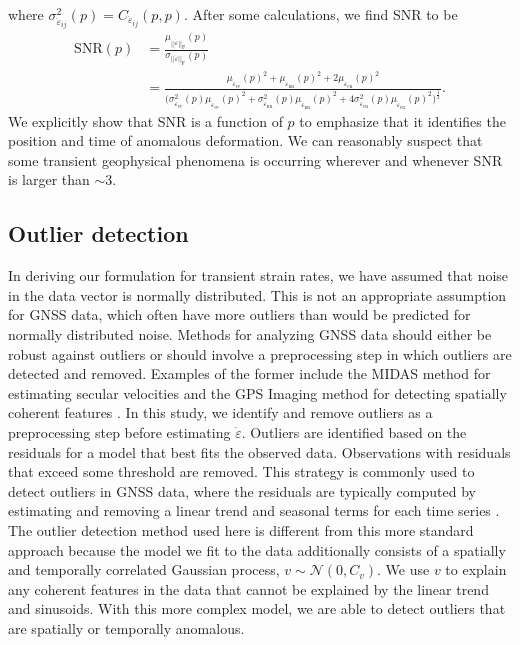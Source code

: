 \documentclass[extra,mreferee]{gji}
\begin{document}
where $\sigma^2_{\dot\varepsilon_{ij}}(p) = C_{\dot\varepsilon_{ij}}(p,p)$. After some calculations, we find SNR to be
\begin{align}\label{eq:SNR}
\mathrm{SNR}(p) &= \frac{\mu_{||\dot\varepsilon||_\mathrm{F}}(p)}{\sigma_{||\dot\varepsilon||_\mathrm{F}}(p)} \\
                &= \frac{\mu_{\dot\varepsilon_\mathrm{ee}}(p)^2 +
                        \mu_{\dot\varepsilon_\mathrm{nn}}(p)^2 +
                        2\mu_{\dot\varepsilon_\mathrm{en}}(p)^2}
                       {\big(\sigma^2_{\dot\varepsilon_\mathrm{ee}}(p)\mu_{\dot\varepsilon_\mathrm{ee}}(p)^2 + 
                             \sigma^2_{\dot\varepsilon_\mathrm{nn}}(p)\mu_{\dot\varepsilon_\mathrm{nn}}(p)^2 + 
                              4\sigma^2_{\dot\varepsilon_\mathrm{en}}(p)\mu_{\dot\varepsilon_\mathrm{en}}(p)^2
                        \big)^{\frac{1}{2}}}
.
\end{align}
We explicitly show that SNR is a function of $p$ to emphasize that it identifies the position and time of anomalous deformation. We can reasonably suspect that some transient geophysical phenomena is occurring wherever and whenever SNR is larger than ${\sim}3$.  

\subsection{Outlier detection}\label{sec:Outlier}
In deriving our formulation for transient strain rates, we have assumed that noise in the data vector is normally distributed. This is not an appropriate assumption for GNSS data, which often have more outliers than would be predicted for normally distributed noise. Methods for analyzing GNSS data should either be robust against outliers or should involve a preprocessing step in which outliers are detected and removed. Examples of the former include the MIDAS method for estimating secular velocities \citep{Blewitt2016} and the GPS Imaging method for detecting spatially coherent features \citep{Hammond2016}.  In this study, we identify and remove outliers as a preprocessing step before estimating $\dot\varepsilon$. Outliers are identified based on the residuals for a model that best fits the observed data. Observations with residuals that exceed some threshold are removed. This strategy is commonly used to detect outliers in GNSS data, where the residuals are typically computed by estimating and removing a linear trend and seasonal terms for each time series \citep[e.g.,][]{Johansson2002,Dong2006,Bos2013}. The outlier detection method used here is different from this more standard approach because the model we fit to the data additionally consists of a spatially and temporally correlated Gaussian process, $v \sim \mathcal{N}(0,C_v)$. We use $v$ to explain any coherent features in the data that cannot be explained by the linear trend and sinusoids. With this more complex model, we are able to detect outliers that are spatially or temporally anomalous. 
\end{document}
